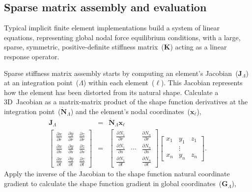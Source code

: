 \documentclass[]             %
{NASA}                       %
\begin{document}
\subsection{Sparse matrix assembly and evaluation}
\label{subsec:Matrix-Assembly}

Typical implicit finite element implementations build a system of linear equations,
 representing global nodal force equilibrium conditions, with
 a large, sparse, symmetric, positive-definite stiffness matrix~($\mathbf{K}$)
 acting as a linear response operator.
 
Sparse stiffness matrix assembly starts by computing an element's
Jacobian~($\mathbf{J}_{\Lambda}$) at an integration point~($\Lambda$)
within each element~($\ell$).
 This Jacobian represents how the element has been distorted from
 its natural shape.
 Calculate a 3D~Jacobian as a matrix-matrix product of the shape function derivatives at the integration
 point~($\dot{\mathbf{N}}_{\Lambda}$) and the element's nodal coordinates~($\mathbf{x}_{\ell}$), 
\begin{eqnarray}
\mathbf{J}_{\Lambda} & = & \dot{\mathbf{N}}_{\Lambda}\mathbf{x}_{\ell}\label{eq:geometric-jacobian}\\
\left[\begin{array}{ccc}
\frac{\partial x}{\partial r} & \frac{\partial y}{\partial r} & \frac{\partial z}{\partial r}\\
\frac{\partial x}{\partial s} & \frac{\partial y}{\partial s} & \frac{\partial z}{\partial s}\\
\frac{\partial x}{\partial t} & \frac{\partial y}{\partial t} & \frac{\partial z}{\partial t}
\end{array}\right] & = & \left[\begin{array}{ccc}
\frac{\partial N_{1}}{\partial r} &  & \frac{\partial N_{n}}{\partial r}\\
\frac{\partial N_{1}}{\partial s} & \cdots & \frac{\partial N_{n}}{\partial s}\\
\frac{\partial N_{1}}{\partial t} &  & \frac{\partial N_{n}}{\partial t}
\end{array}\right]\left[\begin{array}{ccc}
x_{1} & y_{1} & z_{1}\\
 & \vdots\\
x_{n} & y_{n} & z_{n}
\end{array}\right]\text{.}\nonumber 
\end{eqnarray}
 Apply the inverse of the Jacobian to the shape function natural coordinate
 gradient to calculate the shape function gradient in global coordinates~($\mathbf{G}_{\Lambda}$),
\end{document}
